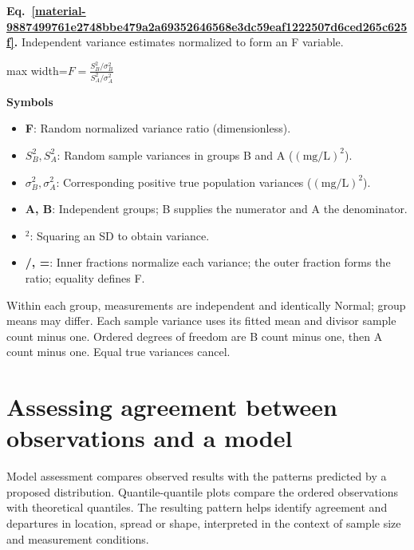 \documentclass[11pt,a4paper]{article}
\begin{document}
\par\medskip
\noindent\begin{minipage}{\linewidth}
\label{material-9887499761e2748bbe479a2a69352646568e3dc59eaf1222507d6ced265c625f}
\noindent\textbf{Eq.~\ref*{material-9887499761e2748bbe479a2a69352646568e3dc59eaf1222507d6ced265c625f}.} Independent variance estimates normalized to form an F variable.\par\nopagebreak
\begin{center}\begin{adjustbox}{max width=\linewidth}$\displaystyle F=\frac{S_B^2/\sigma_B^2}{S_A^2/\sigma_A^2}$\end{adjustbox}\end{center}

\par\noindent\textbf{Symbols}

\begin{itemize}\setlength{\itemsep}{1pt}\setlength{\parsep}{0pt}
\item \textbf{F}: Random normalized variance ratio (dimensionless).
\item \textbf{\(S_B^2, S_A^2\)}: Random sample variances in groups B and A (\(\mathrm{(mg/L)^2}\)).
\item \textbf{\(σ_B^2, σ_A^2\)}: Corresponding positive true population variances (\(\mathrm{(mg/L)^2}\)).
\item \textbf{A, B}: Independent groups; B supplies the numerator and A the denominator.
\item \textbf{\ensuremath{{}^2}}: Squaring an SD to obtain variance.
\item \textbf{/, =}: Inner fractions normalize each variance; the outer fraction forms the ratio; equality defines F.
\end{itemize}

Within each group, measurements are independent and identically Normal; group means may differ. Each sample variance uses its fitted mean and divisor sample count minus one. Ordered degrees of freedom are B count minus one, then A count minus one. Equal true variances cancel.

\end{minipage}\par
\medskip

\clearpage
\section{Assessing agreement between observations and a model}
Model assessment compares observed results with the patterns predicted by a proposed distribution. Quantile-quantile plots compare the ordered observations with theoretical quantiles. The resulting pattern helps identify agreement and departures in location, spread or shape, interpreted in the context of sample size and measurement conditions.
\end{document}

